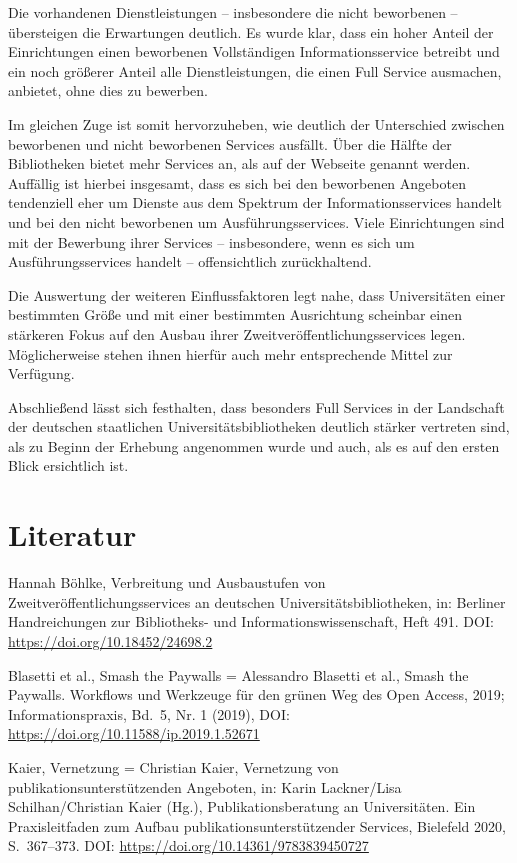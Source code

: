 \documentclass[a4paper,
fontsize=11pt,
oneside,
numbers=noperiodatend,
parskip=half-,
bibliography=totoc,
final
]{scrartcl}
\begin{document}
Die vorhandenen Dienstleistungen -- insbesondere die nicht beworbenen --
übersteigen die Erwartungen deutlich. Es wurde klar, dass ein hoher
Anteil der Einrichtungen einen beworbenen Vollständigen
Informationsservice betreibt und ein noch größerer Anteil alle
Dienstleistungen, die einen Full Service ausmachen, anbietet, ohne dies
zu bewerben.

Im gleichen Zuge ist somit hervorzuheben, wie deutlich der Unterschied
zwischen beworbenen und nicht beworbenen Services ausfällt. Über die
Hälfte der Bibliotheken bietet mehr Services an, als auf der Webseite
genannt werden. Auffällig ist hierbei insgesamt, dass es sich bei den
beworbenen Angeboten tendenziell eher um Dienste aus dem Spektrum der
Informationsservices handelt und bei den nicht beworbenen um
Ausführungsservices. Viele Einrichtungen sind mit der Bewerbung ihrer
Services -- insbesondere, wenn es sich um Ausführungsservices handelt --
offensichtlich zurückhaltend.

Die Auswertung der weiteren Einflussfaktoren legt nahe, dass
Universitäten einer bestimmten Größe und mit einer bestimmten
Ausrichtung scheinbar einen stärkeren Fokus auf den Ausbau ihrer
Zweitveröffentlichungsservices legen. Möglicherweise stehen ihnen
hierfür auch mehr entsprechende Mittel zur Verfügung.

Abschließend lässt sich festhalten, dass besonders Full Services in der
Landschaft der deutschen staatlichen Universitätsbibliotheken deutlich
stärker vertreten sind, als zu Beginn der Erhebung angenommen wurde und
auch, als es auf den ersten Blick ersichtlich ist.

\hypertarget{literatur}{%
\section{Literatur}\label{literatur}}

Hannah Böhlke, Verbreitung und Ausbaustufen von
Zweitveröffentlichungsservices an deutschen Universitätsbibliotheken,
in: Berliner Handreichungen zur Bibliotheks- und
Informationswissenschaft, Heft 491. DOI:
\url{https://doi.org/10.18452/24698.2}

Blasetti et al., Smash the Paywalls = Alessandro Blasetti et al., Smash
the Paywalls. Workflows und Werkzeuge für den grünen Weg des Open
Access, 2019; Informationspraxis, Bd.~5, Nr. 1 (2019), DOI:
\url{https://doi.org/10.11588/ip.2019.1.52671}

Kaier, Vernetzung = Christian Kaier, Vernetzung von
publikationsunterstützenden Angeboten, in: Karin Lackner/Lisa
Schilhan/Christian Kaier (Hg.), Publikationsberatung an Universitäten.
Ein Praxisleitfaden zum Aufbau publikationsunterstützender Services,
Bielefeld 2020, S.~367--373. DOI:
\url{https://doi.org/10.14361/9783839450727}
\end{document}
